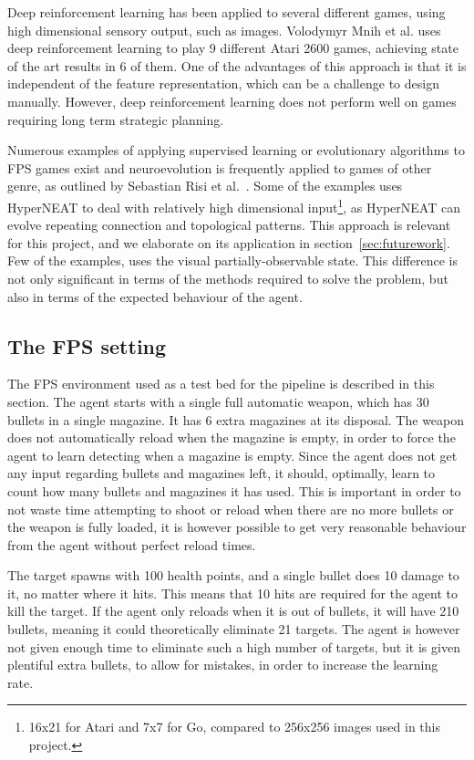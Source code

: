 Deep reinforcement learning has been applied to several different games, using  high dimensional sensory output, such as images. Volodymyr Mnih et al.\cite{DBLP:journals/corr/MnihKSGAWR13} uses deep reinforcement learning to play 9 different Atari 2600 games, achieving state of the art results in 6 of them. One of the advantages of this approach is that it is independent of the feature representation, which can be a challenge to design manually. However, deep reinforcement learning does not perform well on games requiring long term strategic planning.

Numerous examples of applying supervised learning or evolutionary algorithms to FPS games exist\cite{benjamin}\cite{silvano} and neuroevolution is frequently applied to games of other genre, as outlined by Sebastian Risi et al.~\cite{DBLP:journals/corr/RisiT14}. Some of the examples uses HyperNEAT to deal with relatively high dimensional input\footnote{16x21 for Atari and 7x7 for Go, compared to 256x256 images used in this project.}, as HyperNEAT can evolve repeating connection and topological patterns. This approach is relevant for this project, and we elaborate on its application in section~\ref{sec:futurework}. Few of the examples, uses the visual partially-observable state. This difference is not only significant in terms of the methods required to solve the problem, but also in terms of the expected behaviour of the agent.

\subsection{The FPS setting}
\label{sec:fpssetting}

The FPS environment used as a test bed for the pipeline is described in this section. The agent starts with a single full automatic weapon, which has 30 bullets in a single magazine. It has 6 extra magazines at its disposal. The weapon does not automatically reload when the magazine is empty, in order to force the agent to learn detecting when a magazine is empty. Since the agent does not get any input regarding bullets and magazines left, it should, optimally, learn to count how many bullets and magazines it has used. This is important in order to not waste time attempting to shoot or reload when there are no more bullets or the weapon is fully loaded, it is however possible to get very reasonable behaviour from the agent without perfect reload times.

The target spawns with 100 health points, and a single bullet does 10 damage to it, no matter where it hits. This means that 10 hits are required for the agent to kill the target. If the agent only reloads when it is out of bullets, it will have 210 bullets, meaning it could theoretically eliminate 21 targets. The agent is however not given enough time to eliminate such a high number of targets, but it is given plentiful extra bullets, to allow for mistakes, in order to increase the learning rate.

